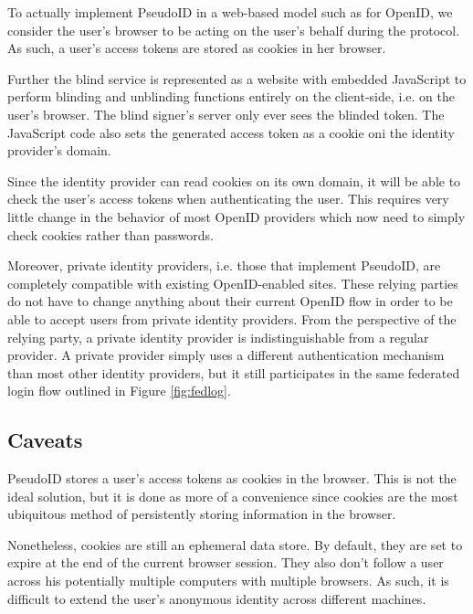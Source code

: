 \documentclass{llncs}
\begin{document}
To actually implement PseudoID in a web-based model such as for OpenID, we
consider the user's browser to be acting on the user's behalf during the
protocol. As such, a user's access tokens are stored as cookies in her browser.

Further the blind service is represented as a website with embedded JavaScript
to perform blinding and unblinding functions entirely on the client-side, i.e.
on the user's browser. The blind signer's server only ever sees the blinded
token. The JavaScript code also sets the generated access token as a cookie oni
the identity provider's domain.

Since the identity provider can read cookies on its own domain, it will be able
to check the user's access tokens when authenticating the user. This requires
very little change in the behavior of most OpenID providers which now need to
simply check cookies rather than passwords.

Moreover, private identity providers, i.e. those that implement PseudoID, are
completely compatible with existing OpenID-enabled sites. These relying parties
do not have to change anything about their current OpenID flow in order to be
able to accept users from private identity providers. From the perspective of
the relying party, a private identity provider is indistinguishable from a
regular provider. A private provider simply uses a different authentication
mechanism than most other identity providers, but it still participates in
the same federated login flow outlined in Figure \ref{fig:fedlog}.

\subsection{Caveats}



PseudoID stores a user's access tokens as cookies in the browser. This is not
the ideal solution, but it is done as more of a convenience since cookies are
the most ubiquitous method of persistently storing information in the browser.

Nonetheless, cookies are still an ephemeral data store. By default, they are set
to expire at the end of the current browser session. They also don't follow a
user across his potentially multiple computers with multiple browsers. As
such, it is difficult to extend the user's anonymous identity across different
machines.
\end{document}

